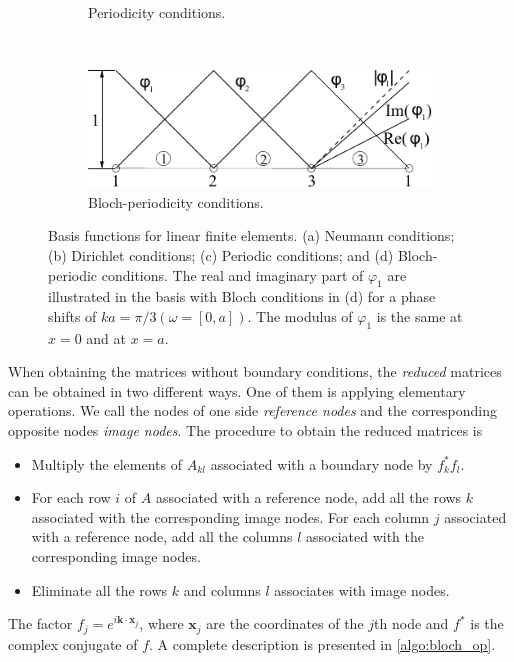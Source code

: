 \begin{figure}[H]
\begin{subfigure}[b]{0.4\textwidth}
		\caption{Periodicity conditions.}
	\end{subfigure}\,
%
	\begin{subfigure}[b]{0.4\textwidth}\qquad
		\includegraphics[width=\textwidth]{img/periodic-interpolation-d.pdf}
		\caption{Bloch-periodicity conditions.}
	\end{subfigure}
\caption{Basis functions for linear finite elements.
 (a) Neumann conditions; (b) Dirichlet conditions; (c) Periodic conditions; and (d) Bloch-periodic conditions. The real and imaginary part of $\varphi_1$ are illustrated in the basis with Bloch conditions in (d) for a phase shifts of $ka=\pi/3 (\omega=[0,a])$. The modulus of $\varphi_1$ is the same at $x=0$ and at $x=a$.}
\label{fig:bloch_interp}
\end{figure}
When obtaining the matrices without boundary conditions, the \emph{reduced} matrices can be obtained in two different ways. One of them is applying elementary operations. We call the nodes of one side  \emph{reference nodes} and the corresponding opposite nodes \emph{image nodes}. The procedure to obtain the reduced matrices is \cite{sukumar_bloch-2009, MSc_thesis-Guarin2012}
\begin{itemize}
\item Multiply the elements of $A_{kl}$ associated with a boundary node by $f_k^{*}f_l$.
\item For each row $i$ of $A$ associated with a reference node, add all the rows $k$ associated with the corresponding image nodes. For each column $j$ associated with a reference node, add all the columns $l$ associated with the corresponding image nodes.
\item Eliminate all the rows $k$ and columns $l$ associates with image nodes.
\end{itemize}
The factor $f_j=e^{i\mathbf{k}\cdot \mathbf{x}_j}$, where $\mathbf{x}_j$ are the coordinates of the $j$th node and $f^{*}$ is the complex conjugate of $f$. A complete  description is presented in \cref{algo:bloch_op}.

